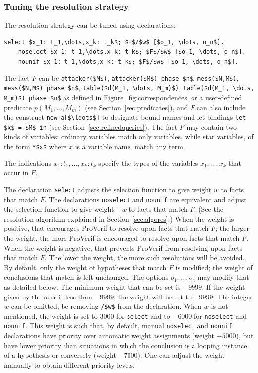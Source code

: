 \documentclass{book}
\begin{document}
\subsubsection{Tuning the resolution strategy.}
\label{sec:nounif}

\sloppy

The resolution strategy can be tuned using declarations:
%
\begin{lstlisting}[numbers=none]
	select $x_1: t_1,\dots,x_k: t_k$; $F$/$w$ [$o_1, \dots, o_n$].
	noselect $x_1: t_1,\dots,x_k: t_k$; $F$/$w$ [$o_1, \dots, o_n$].
	nounif $x_1: t_1,\dots,x_k: t_k$; $F$/$w$ [$o_1, \dots, o_n$].
\end{lstlisting}

The fact $F$ can be \lstinline!attacker($M$)!,
\lstinline!attacker($M$) phase $n$!, \lstinline!mess($N,M$)!, \lstinline!mess($N,M$) phase $n$!,
\lstinline!table($d(M_1, \dots, M_m)$)!, \lstinline!table($d(M_1, \dots, M_m)$) phase $n$!
as defined in Figure~\ref{fig:correspondences} or a user-defined predicate $p(M_1,\dots,M_m)$ (see Section~\ref{sec:predicates}), and $F$ can also include the construct \lstinline!new a[$\ldots$]! to designate bound names and let bindings \lstinline!let $x$ = $M$ in! (see Section~\ref{sec:refinedqueries}).
The fact $F$ may contain two kinds of variables: ordinary variables match only variables, while star variables, of the form \lstinline{*$x$} where $x$ is a variable name, match any term.

\fussy

The indications $x_1: t_1,\dots,x_k: t_k$ specify the types of the variables $x_1, \dots, x_k$ that
occur in $F$.

The declaration \lstinline!select! adjusts the selection function to give weight $w$ to facts that match $F$.
The declarations \lstinline!noselect! and \lstinline!nounif! are equivalent and adjust the selection function to give weight $-w$ to facts that match $F$. (See the resolution algorithm explained in
Section~\ref{sec:algores}.)
When the weight is positive, that encourages ProVerif to resolve upon facts that match $F$;
the larger the weight, the more ProVerif is encouraged to resolve upon facts that match $F$.
When the weight is negative, that prevents ProVerif from resolving upon facts that match $F$.
The lower the weight, the more such resolutions will be avoided.
By default, only the weight of hypotheses that
match $F$ is modified; the weight of conclusions that match is left
unchanged. The options $o_1, \dots, o_n$ may modify that as detailed below.
%
The minimum weight that can
  be set is $-9999$. If the weight given by the user is less than $-9999$, the
  weight will be set to $-9999$.
%
The integer $w$ can be omitted, be removing \lstinline!/$w$! from
the declaration. When $w$ is not mentioned, the weight is set to
$3000$ for \lstinline!select! and to $-6000$ for \lstinline!noselect! and \lstinline!nounif!.
This weight is such that, by default, manual \lstinline!noselect! and \lstinline!nounif!
declarations have priority over
automatic weight assignments (weight $-5000$), but have lower
priority than situations in which the conclusion is a looping instance
of a hypothesis or conversely (weight $-7000$). One can adjust the weight manually
to obtain different priority levels.
\end{document}
